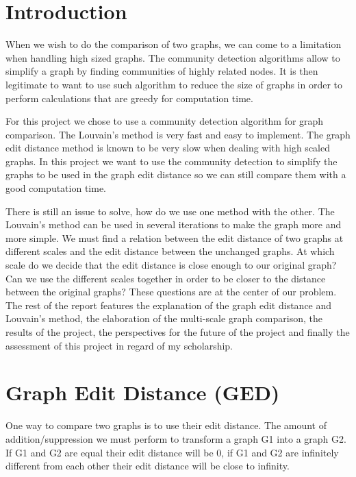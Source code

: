 \documentclass[UTF8, twoside]{EPURapport}
\begin{document}
\chapter{Introduction}

	\hspace{4ex}When we wish to do the comparison of two graphs, we can come to a limitation when handling high sized graphs. The community detection algorithms allow to simplify a graph by finding communities of highly related nodes. It is then legitimate to want to use such algorithm to reduce the size of graphs in order to perform calculations that are greedy for computation time.
	
	For this project we chose to use a community detection algorithm for graph comparison. The Louvain's method is very fast and easy to implement. The graph edit distance method is known to be very slow when dealing with high scaled graphs. In this project we want to use the community detection to simplify the graphs to be used in the graph edit distance so we can still compare them with a good computation time.
	
	There is still an issue to solve, how do we use one method with the other. The Louvain's method can be used in several iterations to make the graph more and more simple. We must find a relation between the edit distance of two graphs at different scales and the edit distance between the unchanged graphs. At which scale do we decide that the edit distance is close enough to our original graph? Can we use the different scales together in order to be closer to the distance between the original graphs? These questions are at the center of our problem.
\\

	The rest of the report features the explanation of the graph edit distance and Louvain's method, the elaboration of the multi-scale graph comparison, the results of the project, the perspectives for the future of the project and finally the assessment of this project in regard of my scholarship.
	
\chapter{Graph Edit Distance (GED)}
\label{GED}

	\hspace{4ex}One way to compare two graphs is to use their edit distance. The amount of addition/suppression we must perform to transform a graph G1 into a graph G2. If G1 and G2 are equal their edit distance will be 0, if G1 and G2 are infinitely different from each other their edit distance will be close to infinity.
	
\end{document}
